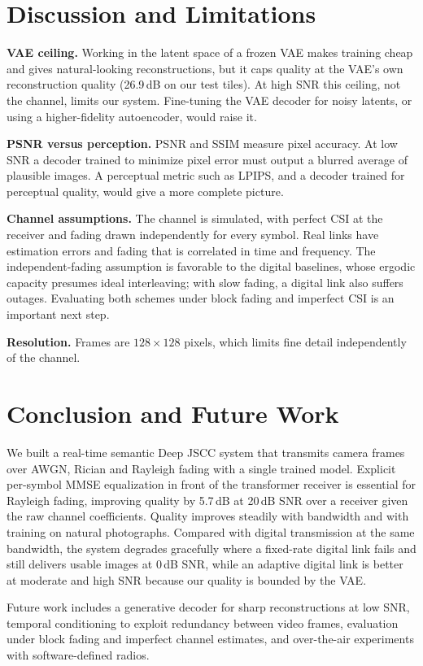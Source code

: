 \documentclass[conference]{IEEEtran}
\begin{document}
\section{Discussion and Limitations}\label{sec:discussion}
\textbf{VAE ceiling.} Working in the latent space of a frozen VAE makes training cheap and gives natural-looking reconstructions, but it caps quality at the VAE's own reconstruction quality (26.9\,dB on our test tiles). At high SNR this ceiling, not the channel, limits our system. Fine-tuning the VAE decoder for noisy latents, or using a higher-fidelity autoencoder, would raise it.

\textbf{PSNR versus perception.} PSNR and SSIM measure pixel accuracy. At low SNR a decoder trained to minimize pixel error must output a blurred average of plausible images. A perceptual metric such as LPIPS, and a decoder trained for perceptual quality, would give a more complete picture.

\textbf{Channel assumptions.} The channel is simulated, with perfect CSI at the receiver and fading drawn independently for every symbol. Real links have estimation errors and fading that is correlated in time and frequency. The independent-fading assumption is favorable to the digital baselines, whose ergodic capacity presumes ideal interleaving; with slow fading, a digital link also suffers outages. Evaluating both schemes under block fading and imperfect CSI is an important next step.

\textbf{Resolution.} Frames are $128\times128$ pixels, which limits fine detail independently of the channel.

\section{Conclusion and Future Work}\label{sec:conclusion}
We built a real-time semantic Deep JSCC system that transmits camera frames over AWGN, Rician and Rayleigh fading with a single trained model. Explicit per-symbol MMSE equalization in front of the transformer receiver is essential for Rayleigh fading, improving quality by 5.7\,dB at 20\,dB SNR over a receiver given the raw channel coefficients. Quality improves steadily with bandwidth and with training on natural photographs. Compared with digital transmission at the same bandwidth, the system degrades gracefully where a fixed-rate digital link fails and still delivers usable images at 0\,dB SNR, while an adaptive digital link is better at moderate and high SNR because our quality is bounded by the VAE.

Future work includes a generative decoder for sharp reconstructions at low SNR, temporal conditioning to exploit redundancy between video frames, evaluation under block fading and imperfect channel estimates, and over-the-air experiments with software-defined radios.

\balance


\end{document}
